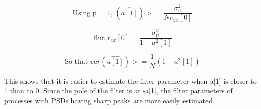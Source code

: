 \begin{equation}
\text{Using p = 1,  } (\hat{a[1]}) >= \frac{\sigma_u^2}{Nr_{xx}[0]}
\end{equation}

\begin{equation}
\text{But  } r_{xx}[0] = \frac{\sigma_u^2}{1-a^2[1]}
\end{equation}

\begin{equation}
\text{So that  } var(\hat{a[1]}) >= \frac{1}{N} (1-a^2[1])
\end{equation}

This shows that it is easier to estimate the filter parameter when a[1] is closer to 1 than to 0. Since the pole of the filter is at -a[1], the filter parameters of processes with PSDs having sharp peaks are more easily estimated.

